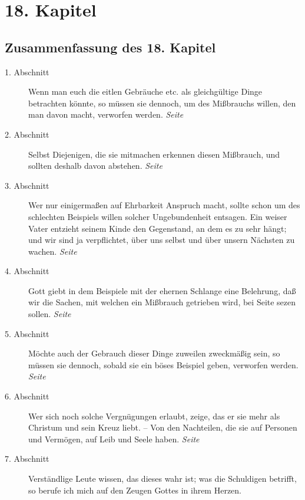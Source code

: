 
\chapter{18. Kapitel} \label{kap18}
\section{Zusammenfassung des 18. Kapitel}

\begin{description}
\item[1. Abschnitt] Wenn man euch die eitlen Gebräuche etc. als gleichgültige
Dinge betrachten könnte, so müssen sie dennoch, um des Mißbrauchs willen, den
man davon macht, verworfen werden.
\dotfill \textit{Seite \pageref{kap18_ab1}}\\
\item[2. Abschnitt] Selbst Diejenigen, die sie mitmachen erkennen diesen
Mißbrauch, und sollten deshalb davon abstehen.
\dotfill \textit{Seite \pageref{kap18_ab2}}\\
\item[3. Abschnitt] Wer nur einigermaßen auf Ehrbarkeit Anspruch macht, sollte
schon um des schlechten Beispiels willen solcher Ungebundenheit entsagen. Ein
weiser Vater entzieht seinem Kinde den Gegenstand, an dem es zu sehr hängt; und
wir sind ja verpflichtet, über uns selbst und über unsern Nächsten zu wachen.
\dotfill \textit{Seite \pageref{kap18_ab3}}\\
\item[4. Abschnitt] Gott giebt in dem Beispiele mit der ehernen Schlange eine
Belehrung, daß wir die Sachen, mit welchen ein Mißbrauch getrieben wird, bei
Seite sezen sollen.
\dotfill \textit{Seite \pageref{kap18_ab4}}\\
\item[5. Abschnitt] Möchte auch der Gebrauch dieser Dinge zuweilen zweckmäßig
sein, so müssen sie dennoch, sobald sie ein böses Beispiel geben, verworfen
werden.
\dotfill \textit{Seite \pageref{kap18_ab5}}\\
\item[6. Abschnitt] Wer sich noch solche Vergnügungen erlaubt, zeige, das er sie
mehr als Christum und sein Kreuz liebt. -- Von den Nachteilen, die sie auf
Personen und Vermögen, auf Leib und Seele haben.
\dotfill \textit{Seite \pageref{kap18_ab6}}\\
\item[7. Abschnitt] Verständlige Leute wissen, das dieses wahr ist; was die
Schuldigen betrifft, so berufe ich mich auf den Zeugen Gottes in ihrem Herzen.

\end{description}

